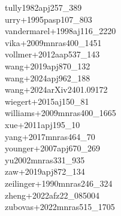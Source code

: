 \documentclass{article}
\begin{document}
\noindent tully1982apj257_389 \\
\noindent urry+1995pasp107_803 \\
\noindent vandermarel+1998aj116_2220 \\
\noindent vika+2009mnras400_1451 \\
\noindent vollmer+2012aap537_143 \\
\noindent wang+2019apj870_132 \\
\noindent wang+2024apj962_188 \\
\noindent wang+2024arXiv2401.09172 \\
\noindent wiegert+2015aj150_81 \\
\noindent williams+2009mnras400_1665 \\
\noindent xue+2011apj195_10 \\
\noindent yang+2017mnras464_70 \\
\noindent younger+2007apj670_269 \\
\noindent yu2002mnras331_935 \\
\noindent zaw+2019apj872_134 \\
\noindent zeilinger+1990mnras246_324 \\
\noindent zheng+2022afz22_085004 \\
\noindent zubovas+2022mnras515_1705 \\
\end{document}
